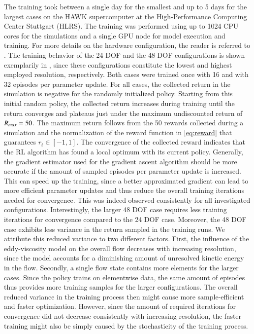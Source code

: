 The training took between a single day for the smallest and up to 5 days for the largest cases on the HAWK supercomputer at the High-Performance Computing Center Stuttgart (HLRS).
The training was performed using up to 1024 CPU cores for the simulations and a single GPU node for model execution and training.
For more details on the hardware configuration, the reader is referred to \cite{kurz2022deep}.
The training behavior of the 24 DOF and the 48 DOF configurations is shown exemplarily in , since these configurations constitute the lowest and highest employed resolution, respectively.
Both cases were trained once with 16 and with 32 episodes per parameter update.
For all cases, the collected return in the simulation is negative for the randomly initialized policy.
Starting from this initial random policy, the collected return increases during training until the return converges and plateaus just under the maximum undiscounted return of $R_{max}=50$.
The maximum return follows from the 50 rewards collected during a simulation and the normalization of the reward function in \eqref{eq:reward} that guarantees $r_t\in[-1,1]$.
The convergence of the collected reward indicates that the RL algorithm has found a local optimum with its current policy.
Generally, the gradient estimator used for the gradient ascent algorithm should be more accurate if the amount of sampled episodes per parameter update is increased.
This can speed up the training, since a better approximated gradient can lead to more efficient parameter updates and thus reduce the overall training iterations needed for convergence.
This was indeed observed consistently for all investigated configurations.
Interestingly, the larger 48 DOF case requires less training iterations for convergence compared to the 24 DOF case.
Moreover, the 48 DOF case exhibits less variance in the return sampled in the training runs.
We attribute this reduced variance to two different factors.
First, the influence of the eddy-viscosity model on the overall flow decreases with increasing resolution, since the model accounts for a diminishing amount of unresolved kinetic energy in the flow.
Secondly, a single flow state contains more elements for the larger cases.
Since the policy trains on elementwise data, the same amount of episodes thus provides more training samples for the larger configurations.
The overall reduced variance in the training process then might cause more sample-efficient and faster optimization.
However, since the amount of required iterations for convergence did not decrease consistently with increasing resolution, the faster training might also be simply caused by the stochasticity of the training process.

